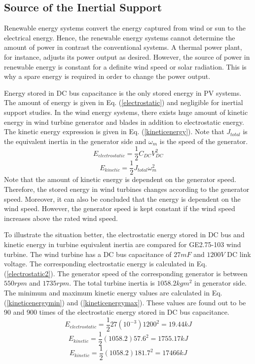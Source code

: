 \subsection{Source of the Inertial Support}
Renewable energy systems convert the energy captured from wind or sun to the electrical energy. Hence, the renewable energy systems cannot determine the amount of power in contrast the conventional systems. A thermal power plant, for instance, adjusts its power output as desired. However, the source of power in renewable energy is constant for a definite wind speed or solar radiation. This is why a spare energy is required in order to change the power output. \par
Energy stored in DC bus capacitance is the only stored energy in PV systems. The amount of energy is given in Eq. (\ref{electrostatic}) and negligible for inertial support studies. In the wind energy systems, there exists huge amount of kinetic energy in wind turbine generator and blades in addition to electrostatic energy. The kinetic energy expression is given in Eq. (\ref{kineticenergy}). Note that $J_{total}$ is the equivalent inertia in the generator side and $\omega_{m}$ is the speed of the generator.
\begin{equation}
E_{electrostatic}=\frac{1}{2} C_{DC}V_{DC}^{2}
\label{electrostatic}
\end{equation}
\begin{equation}
E_{kinetic}=\frac{1}{2} J_{total}\omega_{m}^{2}
\label{kineticenergy}
\end{equation}
Note that the amount of kinetic energy is dependent on the generator speed. Therefore, the stored energy in wind turbines changes according to the generator speed. Moreover, it can also be concluded that the energy is dependent on the wind speed. However, the generator speed is kept constant if the wind speed increases above the rated wind speed. \par
To illustrate the situation better, the electrostatic energy stored in DC bus and kinetic energy in turbine equivalent inertia are compared for GE2.75-103 wind turbine. The wind turbine has a DC bus capacitance of $27mF$ and $1200V$ DC link voltage. The corresponding electrostatic energy is calculated in Eq. (\ref{electrostatic2}). The generator speed of the corresponding generator is between $550rpm$ and $1735rpm$. The total turbine inertia is $1058.2 kgm^2$ in generator side. The minimum and maximum kinetic energy values are calculated in Eq. (\ref{kineticenergymin}) and (\ref{kineticenergymax}). These values are found out to be 90 and 900 times of the electrostatic energy stored in DC bus capacitance.
\begin{equation}
E_{electrostatic}=\frac{1}{2} 27 (10^{-3}) 1200^{2}=19.44kJ
\label{electrostatic2}
\end{equation}
\begin{equation}
E_{kinetic}=\frac{1}{2} (1058.2) 57.6^{2}=1755.17kJ
\label{kineticenergymin}
\end{equation}
\begin{equation}
E_{kinetic}=\frac{1}{2} (1058.2) 181.7^{2}=17466kJ
\label{kineticenergymax}
\end{equation}